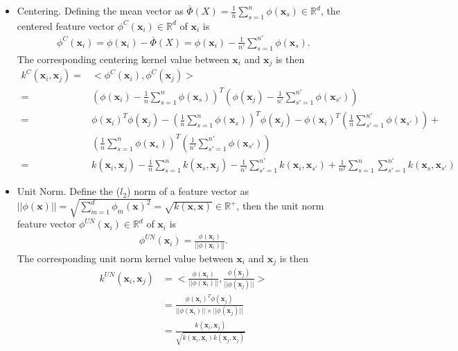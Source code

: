 \documentclass{scrartcl}[2013/05/29]%
\begin{document}
\begin{itemize}
    \item Centering. 
    Defining the mean vector as $\bar{\Phi}(X) = \frac{1}{n} \sum_{s = 1}^n \phi(\mathbf{x}_s) \in \mathbb{R}^d$, the centered feature vector $\phi^C(\mathbf{x}_i) \in \mathbb{R}^d$ of $\mathbf{x}_i$ is
    \begin{align}
        \phi^{C}(\mathbf{x}_i) = \phi(\mathbf{x}_i) - \bar{\Phi}(X) = \phi(\mathbf{x}_i) - \frac{1}{n'} \sum_{s = 1}^{n'} \phi(\mathbf{x}_s).
    \end{align}
    The corresponding centering kernel value between $\mathbf{x}_i$ and $\mathbf{x}_j$ is then 
    \begin{align}
        k^C(\mathbf{x}_i, \mathbf{x}_j) =& <\phi^C(\mathbf{x}_i), \phi^C(\mathbf{x}_j)>\\
        =& \left( \phi(\mathbf{x}_i) - \frac{1}{n} \sum_{s = 1}^n \phi(\mathbf{x}_s)\right)^T \left( \phi(\mathbf{x}_j) - \frac{1}{n'} \sum_{s' = 1}^{n'} \phi(\mathbf{x}_{s'})\right)\\
        =& \phi(\mathbf{x}_i)^T \phi(\mathbf{x}_j) - \left( \frac{1}{n} \sum_{s = 1}^n \phi(\mathbf{x}_s)\right)^T \phi(\mathbf{x}_j) - \phi(\mathbf{x}_i)^T \left(\frac{1}{n} \sum_{s' = 1}^{n'} \phi(\mathbf{x}_{s'})\right) +\\
        &\left( \frac{1}{n} \sum_{s = 1}^n \phi(\mathbf{x}_s)\right)^T \left(\frac{1}{n'} \sum_{s' = 1}^{n'} \phi(\mathbf{x}_{s'})\right)\\
        =& k(\mathbf{x}_i, \mathbf{x}_j) - \frac{1}{n} \sum_{s=1}^n k(\mathbf{x}_s, \mathbf{x}_j) - \frac{1}{n'} \sum_{s'=1}^{n'} k(\mathbf{x}_i, \mathbf{x}_{s'}) + \frac{1}{n^2} \sum_{s = 1}^n \sum_{s'=1}^{n'} k(\mathbf{x}_s, \mathbf{x}_{s'})
    \end{align}
    
    \item Unit Norm. Define the ($l_2$) norm of a feature vector as $||\phi(\mathbf{x})|| = \sqrt{\sum_{m = 1}^d \phi_m(\mathbf{x})^2} = \sqrt{k(\mathbf{x}, \mathbf{x})} \in \mathbb{R}^+$, then the unit norm feature vector $\phi^{UN}(\mathbf{x}_i) \in \mathbb{R}^d$ of $\mathbf{x}_i$ is 
    \begin{align}
        \phi^{UN}(\mathbf{x}_i) = \frac{\phi(\mathbf{x}_i)}{||\phi(\mathbf{x}_i)||}.
    \end{align}
    The corresponding unit norm kernel value between $\mathbf{x}_i$ and $\mathbf{x}_j$ is then 
    \begin{align}
        k^{UN}(\mathbf{x}_i, \mathbf{x}_j) &= <\frac{\phi(\mathbf{x}_i)}{||\phi(\mathbf{x}_i)||}, \frac{\phi(\mathbf{x}_j)}{||\phi(\mathbf{x}_j)||}>\\
        &= \frac{\phi(\mathbf{x}_i)^T \phi(\mathbf{x}_j)}{||\phi(\mathbf{x}_i)|| \times ||\phi(\mathbf{x}_j)||}\\
        &= \frac{k(\mathbf{x}_i, \mathbf{x}_j)}{\sqrt{k(\mathbf{x}_i, \mathbf{x}_i)  k(\mathbf{x}_j, \mathbf{x}_j)}}
    \end{align}
    

\end{itemize}
\end{document}
